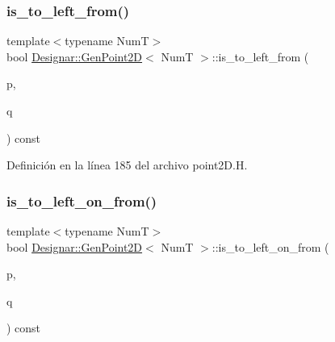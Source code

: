 \mbox{\label{class_designar_1_1_gen_point2_d_a1313b28156494163cdbf421e4cfc264e}} 
\subsubsection{\texorpdfstring{is\+\_\+to\+\_\+left\+\_\+from()}{is\_to\_left\_from()}}
{\footnotesize\ttfamily template$<$typename NumT$>$ \\
bool \hyperlink{class_designar_1_1_gen_point2_d}{Designar\+::\+Gen\+Point2D}$<$ NumT $>$\+::is\+\_\+to\+\_\+left\+\_\+from (\begin{DoxyParamCaption}\item[{const \hyperlink{class_designar_1_1_gen_point2_d}{Gen\+Point2D}$<$ NumT $>$ \&}]{p,  }\item[{const \hyperlink{class_designar_1_1_gen_point2_d}{Gen\+Point2D}$<$ NumT $>$ \&}]{q }\end{DoxyParamCaption}) const\hspace{0.3cm}{\ttfamily [inline]}}



Definición en la línea 185 del archivo point2\+D.\+H.

\mbox{\label{class_designar_1_1_gen_point2_d_af23c6b5033a1e261288d0ba9185f2d53}} 
\subsubsection{\texorpdfstring{is\+\_\+to\+\_\+left\+\_\+on\+\_\+from()}{is\_to\_left\_on\_from()}}
{\footnotesize\ttfamily template$<$typename NumT$>$ \\
bool \hyperlink{class_designar_1_1_gen_point2_d}{Designar\+::\+Gen\+Point2D}$<$ NumT $>$\+::is\+\_\+to\+\_\+left\+\_\+on\+\_\+from (\begin{DoxyParamCaption}\item[{const \hyperlink{class_designar_1_1_gen_point2_d}{Gen\+Point2D}$<$ NumT $>$ \&}]{p,  }\item[{const \hyperlink{class_designar_1_1_gen_point2_d}{Gen\+Point2D}$<$ NumT $>$ \&}]{q }\end{DoxyParamCaption}) const\hspace{0.3cm}{\ttfamily [inline]}}



